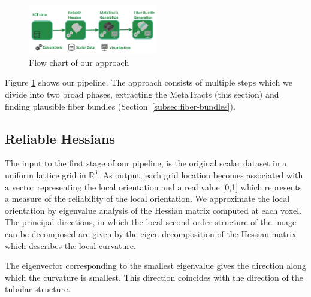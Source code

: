 \begin{figure}
\centering
\includegraphics[width=0.5\textwidth]{imagesMT2014/algo.png}
\caption{Flow chart of our approach}
\label{fig:flowchart}
\end{figure}
 Figure \ref{fig:flowchart} shows our pipeline. The approach consists of multiple steps which we divide into two broad phases, extracting the MetaTracts  (this section) and  finding plausible fiber bundles (Section~\ref{subsec:fiber-bundles}).
\subsection {Reliable Hessians}
\label{subsec:rh}

The input to the first stage of our pipeline, is the original scalar dataset  in a uniform lattice grid in $\mathbb{R}^3$. As output, each grid location becomes associated with a vector representing the local orientation and a real value [0,1] which represents a measure of the reliability of the local orientation. 
We approximate the local orientation by eigenvalue analysis of the Hessian matrix computed at each voxel. The principal directions, in which the local second order structure of the image can be decomposed are given by the eigen decomposition of the Hessian matrix which describes the local curvature.

The eigenvector corresponding to the smallest eigenvalue gives the direction along which the curvature is smallest. This direction coincides with the direction of the tubular structure.

